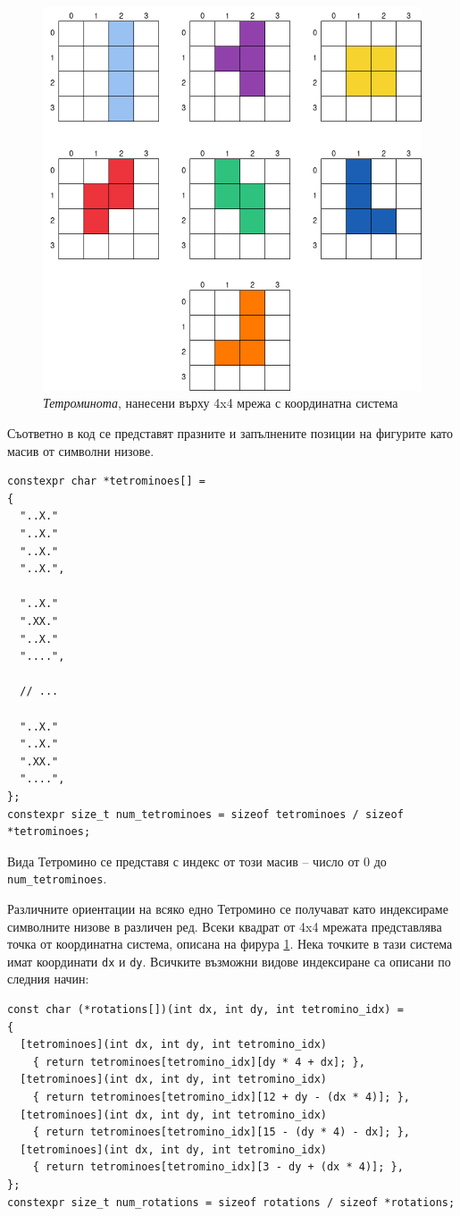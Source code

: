 \documentclass[titlepage, oneside, 12pt]{book}
\begin{document}
\begin{figure}[h!]
    \label{tetrogrid}
    \centering
    \includegraphics[width=0.5\linewidth]{img/tetrominoes_grid.drawio.png}
    \caption{\textit{Тетроминота}, нанесени върху 4x4 мрежа с координатна система}
\end{figure}

Съответно в код се представят празните и запълнените позиции на фигурите като масив от символни низове.

\begin{verbatim}
constexpr char *tetrominoes[] =
{
  "..X."
  "..X."
  "..X."
  "..X.",

  "..X."
  ".XX."
  "..X."
  "....",

  // ...

  "..X."
  "..X."
  ".XX."
  "....",
};
constexpr size_t num_tetrominoes = sizeof tetrominoes / sizeof *tetrominoes;
\end{verbatim}

Вида Тетромино се представя с индекс от този масив -- число от 0 до \texttt{num_tetrominoes}.

Различните ориентации на всяко едно Тетромино се получават като индексираме символните низове в различен ред.
Всеки квадрат от 4x4 мрежата представлява точка от координатна система, описана на фирура \ref{tetrogrid}.
Нека точките в тази система имат координати \texttt{dx} и \texttt{dy}. Всичките възможни видове индексиране са описани по следния начин:

\begin{verbatim}
const char (*rotations[])(int dx, int dy, int tetromino_idx) =
{
  [tetrominoes](int dx, int dy, int tetromino_idx)
    { return tetrominoes[tetromino_idx][dy * 4 + dx]; },
  [tetrominoes](int dx, int dy, int tetromino_idx)
    { return tetrominoes[tetromino_idx][12 + dy - (dx * 4)]; },
  [tetrominoes](int dx, int dy, int tetromino_idx)
    { return tetrominoes[tetromino_idx][15 - (dy * 4) - dx]; },
  [tetrominoes](int dx, int dy, int tetromino_idx)
    { return tetrominoes[tetromino_idx][3 - dy + (dx * 4)]; },
};
constexpr size_t num_rotations = sizeof rotations / sizeof *rotations;
\end{verbatim}
\end{document}
